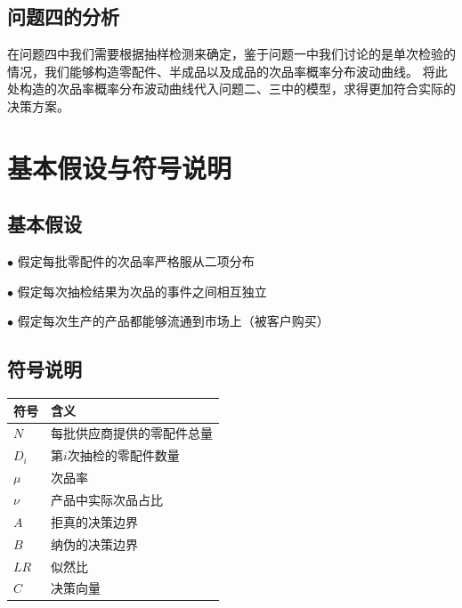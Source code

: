 \documentclass[withoutpreface,bwprint]{cumcmthesis} %
\begin{document}
\subsection{问题四的分析}
在问题四中我们需要根据抽样检测来确定，鉴于问题一中我们讨论的是单次检验的情况，我们能够构造零配件、半成品以及成品的次品率概率分布波动曲线。
将此处构造的次品率概率分布波动曲线代入问题二、三中的模型，求得更加符合实际的决策方案。
\section{基本假设与符号说明}
\subsection{基本假设}
$\bullet$ 假定每批零配件的次品率严格服从二项分布

$\bullet$ 假定每次抽检结果为次品的事件之间相互独立

$\bullet$ 假定每次生产的产品都能够流通到市场上（被客户购买）

\subsection{符号说明}
\begin{longtable}{m{3.5cm}<{\centering}m{10cm}<{\centering}}
	\toprule[1.5pt]
	\textbf{符号} & \textbf{含义}   \\ \midrule[1pt]
	\endfirsthead
	\endhead
	$N$         & 每批供应商提供的零配件总量 \\
	$D_{i}$     & 第$i$次抽检的零配件数量 \\
	$\mu$       & 次品率           \\
	$\nu$       & 产品中实际次品占比     \\
	$A$         & 拒真的决策边界       \\
	$B$         & 纳伪的决策边界       \\
	$LR$        & 似然比           \\
	$C$         & 决策向量          \\
	\bottomrule[1.5pt]
\end{longtable}
\end{document}
